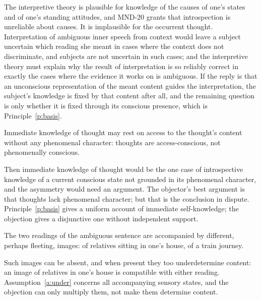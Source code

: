 \documentclass{situationist-preprint}
\begin{document}
\begin{reply}
The interpretive theory is plausible for knowledge of the causes of one's states and of one's standing attitudes, and MND-20 grants that introspection is unreliable about causes. It is implausible for the occurrent thought. Interpretation of ambiguous inner speech from context would leave a subject uncertain which reading she meant in cases where the context does not discriminate, and subjects are not uncertain in such cases; and the interpretive theory must explain why the result of interpretation is so reliably correct in exactly the cases where the evidence it works on is ambiguous. If the reply is that an unconscious representation of the meant content guides the interpretation, the subject's knowledge is fixed by that content after all, and the remaining question is only whether it is fixed through its conscious presence, which is Principle~\ref{p:basis}.
\end{reply}

\begin{objection}\label{o:access}
Immediate knowledge of thought may rest on access to the thought's content without any phenomenal character: thoughts are access-conscious, not phenomenally conscious.
\end{objection}

\begin{reply}
Then immediate knowledge of thought would be the one case of introspective knowledge of a current conscious state not grounded in its phenomenal character, and the asymmetry would need an argument. The objector's best argument is that thoughts lack phenomenal character; but that is the conclusion in dispute. Principle~\ref{p:basis} gives a uniform account of immediate self-knowledge; the objection gives a disjunctive one without independent support.
\end{reply}

\begin{objection}\label{o:hidden}
The two readings of the ambiguous sentence are accompanied by different, perhaps fleeting, images: of relatives sitting in one's house, of a train journey.
\end{objection}

\begin{reply}
Such images can be absent, and when present they too underdetermine content: an image of relatives in one's house is compatible with either reading. Assumption~\ref{a:under} concerns all accompanying sensory states, and the objection can only multiply them, not make them determine content.
\end{reply}
\end{document}
